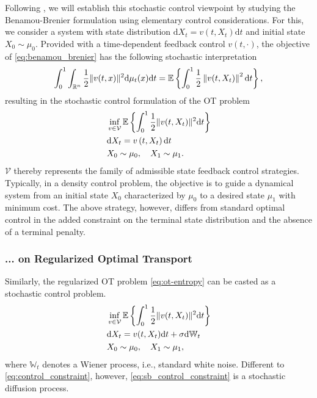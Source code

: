 Following \citet{chen2021optimal, chen2021stochastic}, we will establish this stochastic control viewpoint by studying the Benamou-Brenier formulation using elementary control considerations.
For this, we consider a system with state distribution $\mathrm{d}X_t=v\left(t, X_t\right)\mathrm{d}t$ and initial state $X_0 \sim \mu_0$. Provided with a time-dependent feedback control $v(t, \cdot)$, the objective of \eqref{eq:benamou_brenier} has the following stochastic interpretation
\begin{equation*}
	\int_0^1 \int_{\mathbb{R}^n} \frac{1}{2}\lVert v(t, x)\rVert^2 \mathrm{d}\mu_t(x) \mathrm{d}t = \mathbb{E}\left\{\int_0^1 \frac{1}{2}\left\|v(t, X_t)\right\|^2 \mathrm{d}t\right\},
\end{equation*}
resulting in the stochastic control formulation of the OT problem 
\begin{align}
& \inf _{v \in \mathcal{V}} \mathbb{E}\left\{\int_0^1 \frac{1}{2}\lVert v(t, X_t)\rVert^2 \mathrm{d}t\right\} \\
\label{eq:control_constraint} & \mathrm{d}X_t=v\left(t, X_t\right)\mathrm{d}t  \\
\nonumber & X_0 \sim \mu_0, \quad X_1 \sim \mu_1.
\end{align}
$\mathcal{V}$ thereby represents the family of admissible state feedback control strategies.
Typically, in a density control problem, the objective is to guide a dynamical system from an initial state $X_0$ characterized by $\mu_0$ to a desired state $\mu_1$ with minimum cost. 
The above strategy, however, differs from standard optimal control in the added constraint on the terminal state distribution and the absence of a terminal penalty.


\subsubsection*{... on Regularized Optimal Transport}

Similarly, the regularized OT problem \eqref{eq:ot-entropy} can be casted as a stochastic control problem.
\begin{align}
\label{eq:sb_control}
& \inf _{v \in \mathcal{V}} \mathbb{E}\left\{\int_0^1 \frac{1}{2}\lVert v(t, X_t)\rVert^2 \mathrm{d} t\right\}\\
\label{eq:sb_control_constraint}
& \mathrm{d} X_t = v(t, X_t) \mathrm{d} t + \sigma \mathrm{d} \mathbb{W}_t \\
\nonumber & X_0 \sim \mu_0, \quad X_1 \sim \mu_1,
\end{align}
where $\mathbb{W}_t $ denotes a Wiener process, i.e., standard white noise. 
Different to \eqref{eq:control_constraint}, however, \eqref{eq:sb_control_constraint} is a stochastic diffusion process.

